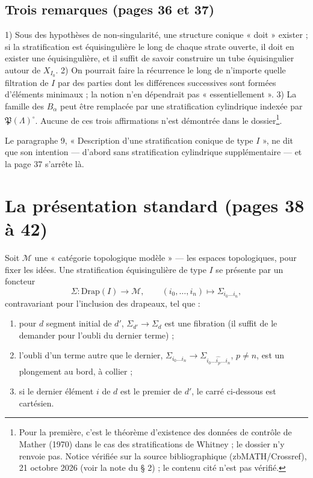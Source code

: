 \documentclass[11pt,a4paper]{article}
\begin{document}
\subsection*{Trois remarques (pages 36 et 37)}

1) Sous des hypothèses de non-singularité, une structure conique « doit »
exister ; si la stratification est équisingulière le long de chaque strate
ouverte, il doit en exister une équisingulière, et il suffit de savoir construire
un tube équisingulier autour de $X_{I_0}$. 2) On pourrait faire la récurrence le
long de n'importe quelle filtration de $I$ par des parties dont les différences
successives sont formées d'éléments minimaux ; la notion n'en dépendrait pas
« essentiellement ». 3) La famille des $B_\alpha$ peut être remplacée par une
stratification cylindrique indexée par $\mathfrak{P}(\Lambda)^{\circ}$. Aucune
de ces trois affirmations n'est démontrée dans le dossier\footnote{Pour la
première, c'est le théorème d'existence des données de contrôle de Mather (1970) dans le cas des stratifications de Whitney ; le dossier n'y renvoie pas. Notice vérifiée sur la source bibliographique (zbMATH/Crossref), 21 octobre 2026 (voir la note du § 2) ; le contenu cité n'est pas vérifié.}.

Le paragraphe 9, « Description d'une stratification conique de type $I$ », ne dit
que son intention — d'abord sans stratification cylindrique supplémentaire — et la
page 37 s'arrête là.

\section*{La présentation standard (pages 38 à 42)}

Soit $\mathcal{M}$ une « catégorie topologique modèle » — les espaces topologiques,
pour fixer les idées. Une stratification équisingulière de type $I$ se présente par
un foncteur
\[
\Sigma : \mathrm{Drap}(I) \longrightarrow \mathcal{M}, \qquad (i_0, …, i_n)
\longmapsto \Sigma_{i_0 … i_n},
\]
contravariant pour l'inclusion des drapeaux, tel que :
\begin{enumerate}
\item[(1)] pour $d$ segment initial de $d'$, $\Sigma_{d'} \to \Sigma_d$ est une
fibration (il suffit de le demander pour l'oubli du dernier terme) ;
\item[(2)] l'oubli d'un terme autre que le dernier, $\Sigma_{i_0 … i_n} \to
\Sigma_{i_0 … \widehat{i_p} … i_n}$, $p \neq n$, est un plongement au bord,
à collier ;
\item[(3)] si le dernier élément $i$ de $d$ est le premier de $d'$, le carré
ci-dessous est cartésien.
\end{enumerate}
\end{document}
